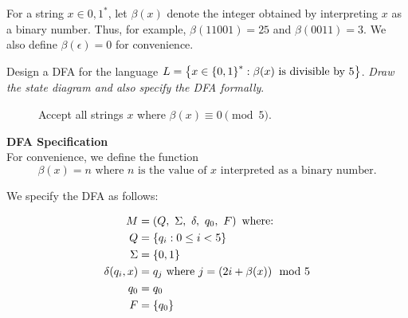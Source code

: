 \begin{problem}
  For a string $x \in {0, 1}^*$, let $\beta(x)$ denote the integer obtained
  by interpreting $x$ as a binary number.
  Thus, for example, $\beta(11001) = 25$ and $\beta(0011) = 3$.
  We also define $\beta(\epsilon) = 0$ for convenience.
  
  \noindent
  Design a DFA for the language $L = \left\{ x \in \left\{0, 1\right\}^* : \beta(x) \text{ is divisible by } 5\right\}$.
  \emph{Draw the state diagram and also specify the DFA formally}.
\end{problem}
\begin{Answer}
  \begin{figure}[H]
    \centering
    \caption{Accept all strings $x$ where $\beta(x) \equiv 0 \pmod 5$.}
    \label{fig:divisible-by-5}
  \end{figure}
  \textbf{DFA Specification}\\
  For convenience, we define the function
  \[ \beta(x) = n \text{ where $n$ is the value of $x$ interpreted as a binary number.}\]
  
  \step
  We specify the DFA as follows:

  \begin{align*}
    M &= \left( Q,\ \Sigma,\ \delta,\ q_0,\ F \right) \text{ where: }\\
    Q &= \left\{q_i : 0 \le i < 5\right\}\\
    \Sigma &= \left\{0, 1\right\}\\
    \delta(q_i, x) &= q_j \text{ where } j = (2i + \beta(x)) \mod 5\\
    q_0 &= q_0\\
    F &= \left\{q_0\right\}
  \end{align*}

\end{Answer}
